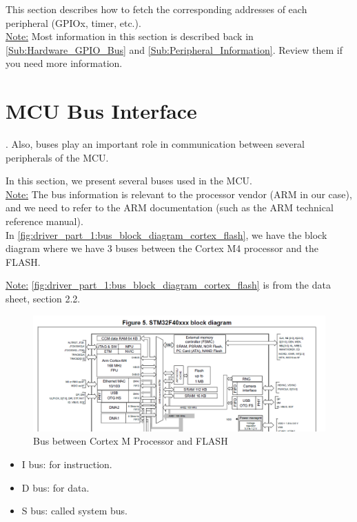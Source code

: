 This section describes how to fetch the corresponding addresses of each peripheral (GPIOx, timer, etc.).\\


\underline{Note:} Most information in this section is described back in \ref{Sub:Hardware_GPIO_Bus} and \ref{Sub:Peripheral_Information}. Review them if you need more information.


\section{MCU Bus Interface}

. Also, buses play an important role in communication between several peripherals of the MCU. 

In this section, we present several buses used in the MCU.\\

\underline{Note:} The bus information is relevant to the processor vendor (ARM in our case), and we need to refer to the ARM documentation (such as the ARM technical reference manual).\\


In \autoref{fig:driver_part_1:bus_block_diagram_cortex_flash}, we have the block diagram where we have 3 buses between the Cortex M4 processor and the FLASH.

\underline{Note:} \autoref{fig:driver_part_1:bus_block_diagram_cortex_flash} is from the data sheet, section 2.2.


\begin{figure}[h]
\centering
\includegraphics[scale=0.8]{Figures/driver_part_1/bus_block_diagram_cortex_flash}
\caption{Bus between Cortex M Processor and FLASH}
\label{fig:driver_part_1:bus_block_diagram_cortex_flash}
\end{figure} 

\begin{itemize}
    \item I bus: for instruction.

    \item D bus: for data.

    \item S bus: called system bus.
\end{itemize}

